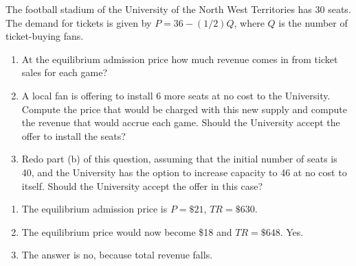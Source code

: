 \begin{enumialphparenastyle}
\begin{ex}\label{ex:ch3ex11}
The football stadium of the University of the North West Territories has 30 seats. The demand for tickets is given by $P=36-(1/2)Q$, where $Q$ is the number of ticket-buying fans.
\begin{enumerate}
	\item	At the equilibrium admission price how much revenue comes in from ticket sales for each game?
	\item	A local fan is offering to install 6 more seats at no cost to the University. Compute the price that would be charged with this new supply and compute the revenue that would accrue each game. Should the University accept the offer to install the seats?
	\item	Redo part (b) of this question, assuming that the initial number of seats is 40, and the University has the option to increase capacity to 46 at no cost to itself. Should the University accept the offer in this case?
\end{enumerate}
\begin{sol}
\begin{enumerate}
	\item	The equilibrium admission price is $P=\$21$, $TR=\$630$.
	\item	The equilibrium price would now become \$18 and $TR=\$648$. Yes.
	\item	The answer is no, because total revenue falls.
\end{enumerate}
\end{sol}
\end{ex}


\end{enumialphparenastyle}
